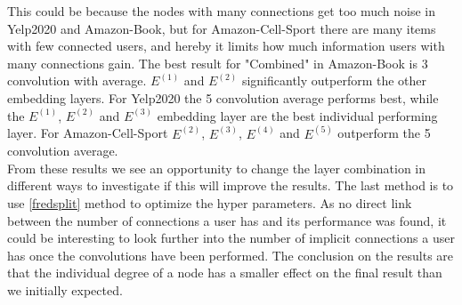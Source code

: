 This could be because the nodes with many connections get too much noise in Yelp2020 and Amazon-Book, but for Amazon-Cell-Sport there are many items with few connected users, and hereby it limits how much information users with many connections gain.
The best result for "Combined" in Amazon-Book is 3 convolution with average.
$E^{(1)}$ and $E^{(2)}$ significantly outperform the other embedding layers.
For Yelp2020 the 5 convolution average performs best, while the $E^{(1)}$, $E^{(2)}$ and $E^{(3)}$ embedding layer are the best individual performing layer.
For Amazon-Cell-Sport $E^{(2)}$, $E^{(3)}$, $E^{(4)}$ and $E^{(5)}$ outperform the 5 convolution average.
\\
From these results we see an opportunity to change the layer combination in different ways to investigate if this will improve the results.
The last method is to use \autoref{fredsplit} method to optimize the hyper parameters.
As no direct link between the number of connections a user has and its performance was found, it could be interesting to look further into the number of implicit connections a user has once the convolutions have been performed.
The conclusion on the results are that the individual degree of a node has a smaller effect on the final result than we initially expected.

